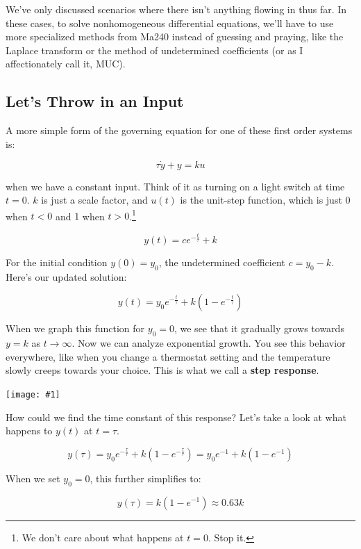\documentclass{article}
\newcommand{\bicture}[1]{
\begin{center}
    {\texttt{[image: \#1]}}
\end{center}}
\begin{document}
\begin{onehalfspacing}
\begin{flushleft}
We've only discussed scenarios where there isn't anything flowing in thus far. In these cases, to solve nonhomogeneous differential equations, we'll have to use more specialized methods from Ma240 instead of guessing and praying, like the Laplace transform or the method of undetermined coefficients (or as I affectionately call it, MUC).

\subsection{Let's Throw in an Input}

A more simple form of the governing equation for one of these first order systems is:

\vspace{-0.1in}
\[\tau \dot{y} + y = ku\]

when we have a constant input. Think of it as turning on a light switch at time \(t=0\). \(k\) is just a scale factor, and \(u(t)\) is the unit-step function, which is just \(0\) when \(t<0\) and \(1\) when \(t>0\).\footnote{We don't care about what happens at \(t=0\). Stop it.}

\vspace{-0.1in}
\[y(t) = ce^{-\frac{t}{\tau}} + k\]

For the initial condition \(y(0) = y_0\), the undetermined coefficient \(c=y_0 - k\). Here's our updated solution:

\vspace{-0.1in}
\[y(t) = y_0 e^{-\frac{t}{\tau}} + k(1-e^{-\frac{t}{\tau}})\]

When we graph this function for \(y_0 = 0\), we see that it gradually grows towards \(y=k\) as \(t\to\infty\). Now we can analyze exponential growth. You see this behavior everywhere, like when you change a thermostat setting and the temperature slowly creeps towards your choice. This is what we call a \textbf{step response}.

\bicture{2_step}

How could we find the time constant of this response? Let's take a look at what happens to \(y(t)\) at \(t=\tau\).

\vspace{-0.1in}
\[y(\tau) = y_0 e^{-\frac{\tau}{\tau}} + k(1-e^{-\frac{\tau}{\tau}})= y_0 e^{-1} + k(1-e^{-1})\]

When we set \(y_0 = 0\), this further simplifies to:

\vspace{-0.1in}
\[y(\tau) = k(1-e^{-1}) \approx 0.63 k\]


\end{flushleft}
\end{onehalfspacing}
\end{document}
